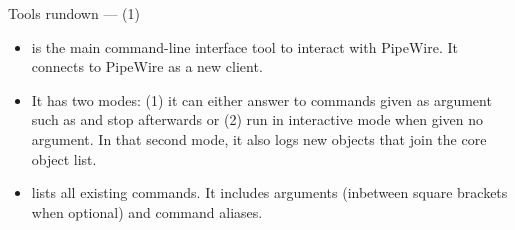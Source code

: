 \begin{frame}{Tools rundown —  (1)}
  \begin{itemize}

  \item {} is the main command-line interface tool to
    interact with PipeWire. It connects to PipeWire as a new client.

  \item It has two modes: (1) it can either answer to commands given as
    argument such as  and stop afterwards or (2) run
    in interactive mode when given no argument. In that second mode, it
    also logs new objects that join the core object list.

  \item {} lists all existing commands. It includes
    arguments (inbetween square brackets when optional) and command
    aliases.

  \end{itemize}
\end{frame}



